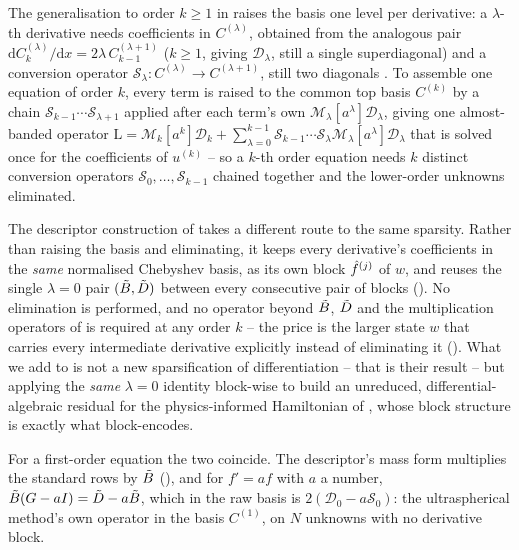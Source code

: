 The generalisation to order $k \ge 1$ in \cite{olver2013} raises the basis
one level per derivative: a $\lambda$-th derivative needs coefficients in
$C^{(\lambda)}$, obtained from the analogous pair
$\mathrm{d}C_k^{(\lambda)}/\mathrm{d}x = 2\lambda\,C_{k-1}^{(\lambda+1)}$
($k\ge1$, giving $\mathcal{D}_\lambda$, still a single superdiagonal) and a
conversion operator $\mathcal{S}_\lambda : C^{(\lambda)} \to C^{(\lambda+1)}$,
still two diagonals \cite[Eqs.~3.2--3.3]{olver2013}. To assemble one equation
of order $k$, every term is raised to the common top basis $C^{(k)}$ by a
chain $\mathcal{S}_{k-1}\cdots\mathcal{S}_{\lambda+1}$ applied after each
term's own $\mathcal{M}_\lambda[a^\lambda]\mathcal{D}_\lambda$, giving one
almost-banded operator $\mathrm{L} = \mathcal{M}_k[a^k]\mathcal{D}_k +
\sum_{\lambda=0}^{k-1}\mathcal{S}_{k-1}\cdots\mathcal{S}_\lambda
\mathcal{M}_\lambda[a^\lambda]\mathcal{D}_\lambda$ that is solved once for
the coefficients of $u^{(k)}$ \cite[\S3.2]{olver2013} -- so a $k$-th order
equation needs $k$ distinct conversion operators $\mathcal{S}_0, \dots,
\mathcal{S}_{k-1}$ chained together and the lower-order unknowns eliminated.

The descriptor construction of  takes a
different route to the same sparsity. Rather than raising the basis and
eliminating, it keeps every derivative's coefficients in the \emph{same}
normalised Chebyshev basis, as its own block $\hat{f}^{(j)}$ of $w$, and reuses the
single $\lambda = 0$ pair $(\tilde{B}, \tilde{D})$ between every consecutive
pair of blocks (). No elimination is
performed, and no operator beyond $\tilde{B}$, $\tilde{D}$ and the
multiplication operators of  is required at any
order $k$ -- the price is the larger state $w$ that carries every
intermediate derivative explicitly instead of eliminating it
(). What we add to \cite{olver2013}
is not a new sparsification of differentiation -- that is their result -- but
applying the \emph{same} $\lambda = 0$ identity block-wise to build an
unreduced, differential-algebraic residual for the physics-informed
Hamiltonian of \cite{wu2025pihm}, whose block structure is exactly what
 block-encodes.

For a first-order equation the two coincide. The descriptor's mass form multiplies the standard rows by $\tilde{B}$ (), and for $f'=af$ with $a$ a number, $\tilde{B}(G-aI)=\tilde{D}-a\tilde{B}$, which in the raw basis is $2(\mathcal{D}_0-a\mathcal{S}_0)$: the ultraspherical method's own operator in the basis $C^{(1)}$, on $N$ unknowns with no derivative block.

